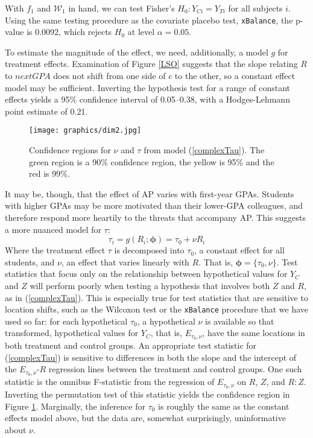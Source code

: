 \documentclass[12pt]{article}
\newcommand{\g}{g}
\newcommand{\ych}{E}
\begin{document}
With $f_1$ and $\mathcal{W}_1$ in hand, we can test Fisher's %
$H_0: Y_{Ci}=Y_{Ti}$ for all subjects $i$.
Using the same testing procedure as the covariate placebo test, \verb|xBalance|,
the p-value is 0.0092, which rejects $H_0$ at level $\alpha=0.05$.

To estimate the magnitude of the effect, we need, additionally, a model $\g$ for treatment effects.
Examination of Figure \ref{LSO} suggests that the slope relating $R$
to $nextGPA$ does not shift from one side of $c$ to the other, so a
constant effect model may be sufficient.
Inverting the hypothesis test for a range of constant effects
yields a 95\% confidence interval of 0.05--0.38,
with a Hodges-Lehmann point estimate of 0.21.

\begin{figure}
  \centering
  \texttt{[image: graphics/dim2.jpg]}
  \caption{Confidence regions for $\nu$ and $\tau$ from model (\ref{complexTau}). The green region is a 90\% confidence region, the yellow is 95\% and the red is 99\%.}
  \label{dim2}
\end{figure}

It may be, though, that the effect of AP varies with first-year GPAs.
Students with higher GPAs may be more motivated than their lower-GPA
colleagues, and therefore respond more heartily to the threats that
accompany AP.
This suggests a more nuanced model for $\tau$:
\begin{equation}\label{complexTau}
  \tau_i=\g(R_i; \bm{\phi})=\tau_0+\nu R_i
\end{equation}
Where the treatment effect $\tau$ is decomposed into $\tau_0$, a
constant effect for all students, and
$\nu$, an effect that varies linearly with $R$.
That is, $\bm{\phi}=\{\tau_0,\nu\}$.
Test statistics that focus only on the relationship
between hypothetical values for $Y_C$ and $Z$ will perform poorly when
testing a hypothesis that involves both $Z$ and $R$, as in
(\ref{complexTau}).
This is especially true for test statistics that are sensitive to
location shifts, such as the Wilcoxon test or the
\verb|xBalance| procedure that we have used so far: for
each hypothetical $\tau_0$, a hypothetical $\nu$ is available so that
transformed, hypothetical values for $Y_C$, that is,
$\ych_{\tau_0,\nu}$, have the same locations in both treatment and control groups.
An appropriate test statistic for (\ref{complexTau}) is sensitive to
differences in both the slope and the intercept of the $\ych_{\tau_0,\nu}$-$R$
regression lines between the treatment and control groups.
One such statistic is the omnibus F-statistic from the regression of
$\ych_{\tau_0,\nu}$ on $R$, $Z$, and $R:Z$.
Inverting the permutation test of this statistic yields the confidence
region in Figure \ref{dim2}.
Marginally, the inference for $\tau_0$ is roughly the same as the constant effects
model above, but the data are, somewhat surprisingly, uninformative
about $\nu$.
\end{document}
